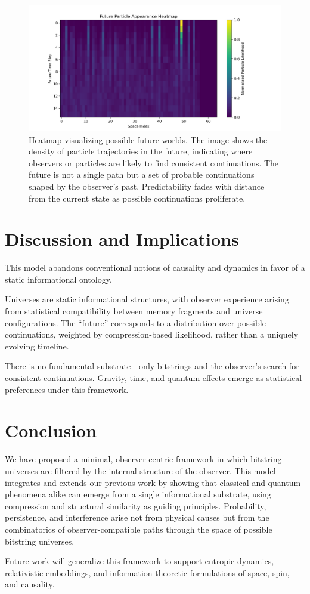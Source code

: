 \documentclass[12pt]{article}
\begin{document}
\begin{figure}[h!]
    \centering
    \includegraphics[width=1.0\textwidth]{figures/future_particle_heatmap.png}
    \caption{Heatmap visualizing possible future worlds. The image shows the density of particle trajectories in the future, indicating where observers or particles are likely to find consistent continuations. The future is not a single path but a set of probable continuations shaped by the observer's past. Predictability fades with distance from the current state as possible continuations proliferate.}
    \label{fig:future_particle_heatmap}
\end{figure}

\section{Discussion and Implications}

This model abandons conventional notions of causality and dynamics in favor of a static informational ontology.

Universes are static informational structures, with observer experience arising from statistical compatibility between memory fragments and universe configurations. The “future” corresponds to a distribution over possible continuations, weighted by compression-based likelihood, rather than a uniquely evolving timeline.

There is no fundamental substrate—only bitstrings and the observer's search for consistent continuations. Gravity, time, and quantum effects emerge as statistical preferences under this framework.


\section{Conclusion}

We have proposed a minimal, observer-centric framework in which bitstring universes are filtered by the internal structure of the observer. This model integrates and extends our previous work by showing that classical and quantum phenomena alike can emerge from a single informational substrate, using compression and structural similarity as guiding principles. Probability, persistence, and interference arise not from physical causes but from the combinatorics of observer-compatible paths through the space of possible bitstring universes.

Future work will generalize this framework to support entropic dynamics, relativistic embeddings, and information-theoretic formulations of space, spin, and causality.
\end{document}
